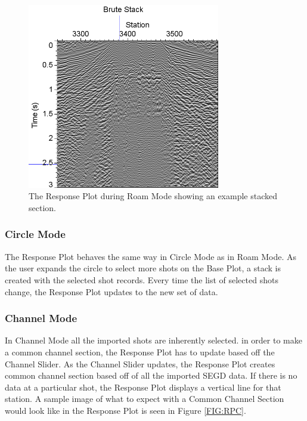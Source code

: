 \documentclass[12pt]{article}
\begin{document}
\begin{figure}[h]
\centering
\includegraphics[width=0.75\textwidth]{./figs/fig3.png}
\caption{The Response Plot during Roam Mode showing an example stacked section.}
\label{FIG:RPR}
\end{figure}

\subsubsection{Circle Mode}

The Response Plot behaves the same way in Circle Mode as in Roam Mode. As the user expands the circle to select more shots on the Base Plot, a stack is created with the selected shot records. Every time the list of selected shots change, the Response Plot updates to the new set of data.

\subsubsection{Channel Mode}

In Channel Mode all the imported shots are inherently selected. in order to make a common channel section, the Response Plot has to update based off the Channel Slider. As the Channel Slider updates, the Response Plot creates common channel section based off of all the imported SEGD data. If there is no data at a particular shot, the Response Plot displays a vertical line for that station. A sample image of what to expect with a Common Channel Section would look like in the Response Plot is seen in Figure \ref{FIG:RPC}.
\end{document}
